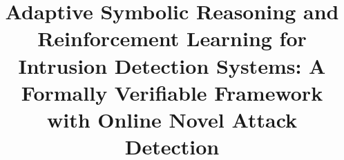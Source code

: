 \documentclass[conference]{IEEEtran}
\begin{document}
\title{Adaptive Symbolic Reasoning and Reinforcement Learning for Intrusion Detection Systems: A Formally Verifiable Framework with Online Novel Attack Detection}

\author{
}

\maketitle

\end{document}

